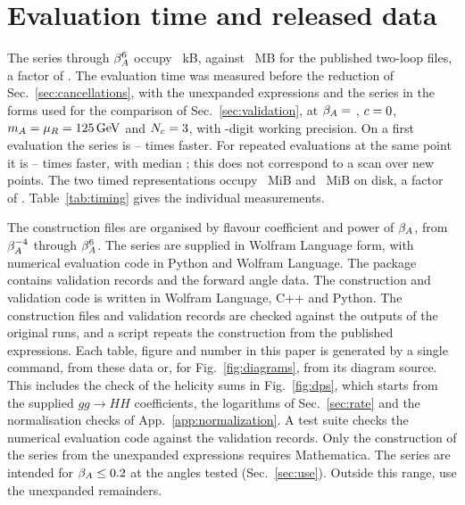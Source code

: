 \section{Evaluation time and released data}
\label{app:data}
\FloatBarrier

The series through $\beta_A^6$ occupy \SeriesKB~kB, against \PublishedTwoLoopMB~MB for the published two-loop files, a factor of \SizeRatio. The evaluation time was measured before the reduction of Sec.~\ref{sec:cancellations}, with the unexpanded expressions and the series in the forms used for the comparison of Sec.~\ref{sec:validation}, at $\beta_A=$ \TimingBetas, $c=0$, $m_A=\mu_R=125\,\mathrm{GeV}$ and $N_c=3$, with \TimingPrecision-digit working precision. On a first evaluation the series is \TimingFirstMin--\TimingFirstMax{} times faster. For repeated evaluations at the same point it is \TimingWarmMin--\TimingWarmMax{} times faster, with median \TimingWarmMedian; this does not correspond to a scan over new points. The two timed representations occupy \TimingSeriesMiB~MiB and \TimingExactMiB~MiB on disk, a factor of \TimingRepresentationRatio. Table~\ref{tab:timing} gives the individual measurements.



The construction files are organised by flavour coefficient and power of $\beta_A$, from $\beta_A^{-4}$ through $\beta_A^6$. The series are supplied in Wolfram Language form, with numerical evaluation code in Python and Wolfram Language.
The package contains \ValidationRows{} validation records and the forward angle data.
The construction and validation code is written in Wolfram Language, C++ and Python.
The construction files and validation records are checked against the outputs of the original runs, and a script repeats the construction from the published expressions.
Each table, figure and number in this paper is generated by a single command, from these data or, for Fig.~\ref{fig:diagrams}, from its diagram source. This includes the check of the helicity sums in Fig.~\ref{fig:dps}, which starts from the supplied $gg\to HH$ coefficients, the logarithms of Sec.~\ref{sec:rate} and the normalisation checks of App.~\ref{app:normalization}.
A test suite checks the numerical evaluation code against the validation records.
Only the construction of the series from the unexpanded expressions requires Mathematica.
The series are intended for $\beta_A\leq0.2$ at the angles tested (Sec.~\ref{sec:use}).
Outside this range, use the unexpanded remainders.
